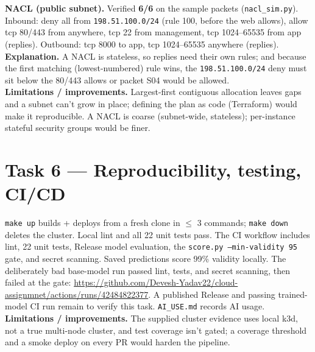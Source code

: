 \documentclass[10pt,a4paper]{article}
\newcommand{\code}[1]{\texttt{\small #1}}
\begin{document}
\noindent\textbf{NACL (public subnet).} Verified \textbf{6/6} on the sample packets (\code{nacl\_sim.py}).
Inbound: deny all from \code{198.51.100.0/24} (rule 100, before the web allows), allow tcp 80/443 from
anywhere, tcp 22 from management, tcp 1024--65535 from app (replies). Outbound: tcp 8000 to app, tcp
1024--65535 anywhere (replies). \textbf{Explanation.} A NACL is stateless, so replies need their own rules;
and because the first matching (lowest-numbered) rule wins, the \code{198.51.100.0/24} deny must sit below
the 80/443 allows or packet S04 would be allowed.\\
\textbf{Limitations / improvements.} Largest-first contiguous allocation leaves gaps and a subnet can't grow
in place; defining the plan as code (Terraform) would make it reproducible. A NACL is coarse (subnet-wide,
stateless); per-instance stateful security groups would be finer.

\section{Task 6 --- Reproducibility, testing, CI/CD}
\code{make up} builds + deploys from a fresh clone in $\leq$ 3 commands; \code{make down} deletes the
cluster. Local lint and all 22 unit tests pass. The CI workflow includes lint, 22 unit tests, Release model evaluation, the
\code{score.py --min-validity 95} gate, and secret scanning. Saved predictions score 99\% validity
locally. The deliberately bad base-model run passed lint, tests, and secret scanning, then failed at
the gate: \url{https://github.com/Devesh-Yadav22/cloud-assignmnet/actions/runs/42484822377}.
A published Release and passing trained-model CI run remain to verify this task.
\code{AI\_USE.md} records AI usage.\\
\textbf{Limitations / improvements.} The supplied cluster evidence uses local k3d, not a true
multi-node cluster, and test coverage isn't gated; a coverage threshold and a smoke deploy on every PR would
harden the pipeline.
\end{document}
